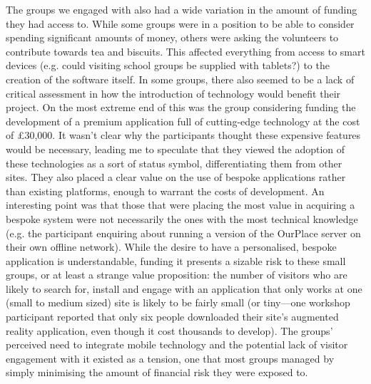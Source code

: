 The groups we engaged with also had a wide variation in the amount of funding they had access to. While some groups were in a position to be able to consider spending significant amounts of money, others were asking the volunteers to contribute towards tea and biscuits. This affected everything from access to smart devices (e.g. could visiting school groups be supplied with tablets?) to the creation of the software itself. In some groups, there also seemed to be a lack of critical assessment in how the introduction of technology would benefit their project. On the most extreme end of this was the group considering funding the development of a premium application full of cutting-edge technology at the cost of £30,000. It wasn't clear why the participants thought these expensive features would be necessary, leading me to speculate that they viewed the adoption of these technologies as a sort of status symbol, differentiating them from other sites. They also placed a clear value on the use of bespoke applications rather than existing platforms, enough to warrant the costs of development. An interesting point was that those that were placing the most value in acquiring a bespoke system were not necessarily the ones with the most technical knowledge (e.g. the participant enquiring about running a version of the OurPlace server on their own offline network). While the desire to have a personalised, bespoke application is understandable, funding it presents a sizable risk to these small groups, or at least a strange value proposition: the number of visitors who are likely to search for, install and engage with an application that only works at one (small to medium sized) site is likely to be fairly small (or tiny---one workshop participant reported that only six people downloaded their site's augmented reality application, even though it cost thousands to develop). The groups' perceived need to integrate mobile technology and the potential lack of visitor engagement with it existed as a tension, one that most groups managed by simply minimising the amount of financial risk they were exposed to.

